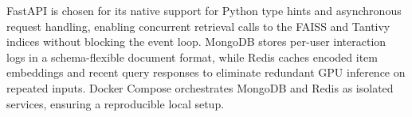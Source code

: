 FastAPI is chosen for its native support for Python type hints and asynchronous request handling, enabling concurrent retrieval calls to the FAISS and Tantivy indices without blocking the event loop.
MongoDB stores per-user interaction logs in a schema-flexible document format, while Redis caches encoded item embeddings and recent query responses to eliminate redundant GPU inference on repeated inputs.
Docker Compose orchestrates MongoDB and Redis as isolated services, ensuring a reproducible local setup.

